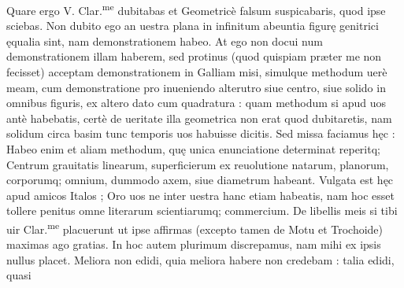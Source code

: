\documentclass[11pt,a4paper]{article}
\begin{document}
Quare ergo V. Clar.\textsuperscript{me} dubitabas et Geometricè falsum suspicabaris, quod ipse sciebas. Non dubito ego an uestra plana in infinitum abeuntia figurę genitrici ęqualia sint, nam demonstrationem habeo. At ego non docui num demonstrationem illam haberem, sed protinus (quod quispiam præter me non fecisset) acceptam demonstrationem in Galliam misi, simulque methodum uerè meam, cum demonstratione pro inueniendo alterutro siue centro, siue solido in omnibus figuris, ex altero dato cum quadratura : quam methodum si apud uos antè habebatis, certè de ueritate illa geometrica non erat quod dubitaretis, nam solidum circa basim tunc temporis uos habuisse dicitis. Sed missa faciamus hęc : Habeo enim et aliam methodum, quę unica enunciatione determinat reperitq; Centrum grauitatis linearum, superficierum ex reuolutione natarum, planorum, corporumq; omnium, dummodo axem, siue diametrum habeant. Vulgata est hęc apud amicos Italos ; Oro uos ne inter uestra hanc etiam habeatis, nam hoc esset tollere penitus omne literarum scientiarumq; commercium. De libellis meis si tibi uir Clar.\textsuperscript{me} placuerunt ut ipse affirmas (excepto tamen de Motu et Trochoide) maximas ago gratias. In hoc autem plurimum discrepamus, nam mihi ex ipsis nullus placet. Meliora non edidi, quia meliora habere non credebam : talia edidi, quasi

\end{document}
